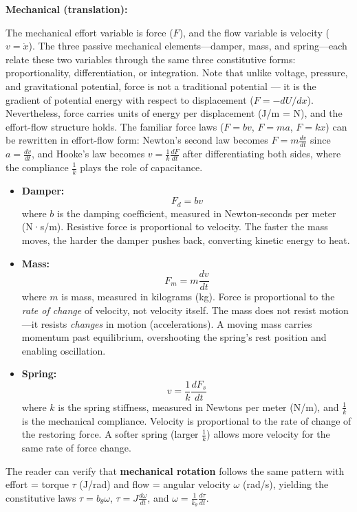 \documentclass[
  letterpaper,
  DIV=11,
  numbers=noendperiod]{scrartcl}
\begin{document}
\textbf{Mechanical (translation):}

The mechanical effort variable is force (\(F\)), and the flow variable
is velocity (\(v = \dot{x}\)). The three passive mechanical
elements---damper, mass, and spring---each relate these two variables
through the same three constitutive forms: proportionality,
differentiation, or integration. Note that unlike voltage, pressure, and
gravitational potential, force is not a traditional potential --- it is
the gradient of potential energy with respect to displacement
(\(F = -dU/dx\)). Nevertheless, force carries units of energy per
displacement (J/m = N), and the effort-flow structure holds. The
familiar force laws (\(F = bv\), \(F = ma\), \(F = kx\)) can be
rewritten in effort-flow form: Newton's second law becomes
\(F = m\frac{dv}{dt}\) since \(a = \frac{dv}{dt}\), and Hooke's law
becomes \(v = \frac{1}{k}\frac{dF}{dt}\) after differentiating both
sides, where the compliance \(\frac{1}{k}\) plays the role of
capacitance.

\begin{itemize}
\item
  \textbf{Damper:} \[F_d = bv\] where \(b\) is the damping coefficient,
  measured in Newton-seconds per meter (N·s/m). Resistive force is
  proportional to velocity. The faster the mass moves, the harder the
  damper pushes back, converting kinetic energy to heat.
\item
  \textbf{Mass:} \[F_m = m\frac{dv}{dt}\] where \(m\) is mass, measured
  in kilograms (kg). Force is proportional to the \emph{rate of change}
  of velocity, not velocity itself. The mass does not resist motion---it
  resists \emph{changes} in motion (accelerations). A moving mass
  carries momentum past equilibrium, overshooting the spring's rest
  position and enabling oscillation.
\item
  \textbf{Spring:} \[v = \frac{1}{k}\frac{dF_s}{dt}\] where \(k\) is the
  spring stiffness, measured in Newtons per meter (N/m), and
  \(\frac{1}{k}\) is the mechanical compliance. Velocity is proportional
  to the rate of change of the restoring force. A softer spring (larger
  \(\frac{1}{k}\)) allows more velocity for the same rate of force
  change.
\end{itemize}

\begin{tcolorbox}[enhanced jigsaw, title=\textcolor{quarto-callout-note-color}{\faInfo}\hspace{0.5em}{Note}, breakable, left=2mm, opacitybacktitle=0.6, rightrule=.15mm, opacityback=0, toptitle=1mm, bottomrule=.15mm, arc=.35mm, leftrule=.75mm, colbacktitle=quarto-callout-note-color!10!white, toprule=.15mm, colframe=quarto-callout-note-color-frame, bottomtitle=1mm, titlerule=0mm, colback=white, coltitle=black]

The reader can verify that \textbf{mechanical rotation} follows the same
pattern with effort = torque \(\tau\) (J/rad) and flow = angular
velocity \(\omega\) (rad/s), yielding the constitutive laws
\(\tau = b_\theta \omega\), \(\tau = J\frac{d\omega}{dt}\), and
\(\omega = \frac{1}{k_\theta}\frac{d\tau}{dt}\).

\end{tcolorbox}
\end{document}

